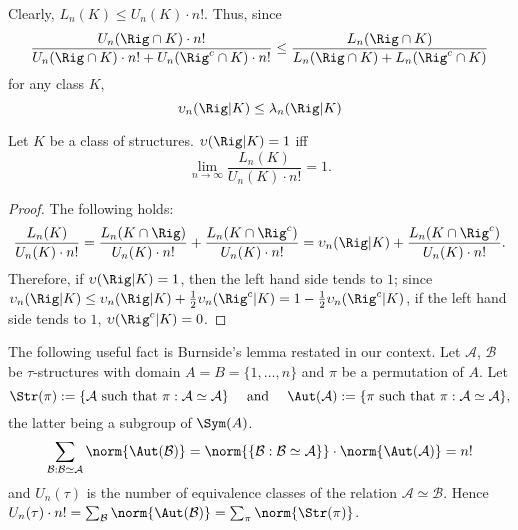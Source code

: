 Clearly, $L_n(K) \le U_n(K) \cdot n!$.
Thus, since
$$\frac{U_n(\Rig \cap K) \cdot n!}{U_n(\Rig \cap K) \cdot n! + U_n(\Rig^c \cap K) \cdot n!} \le \frac{L_n(\Rig \cap K) }{L_n(\Rig \cap K) +L_n(\Rig^c \cap K) } $$ 
for any class $K$, 
\begin{equation}
\label{ineq}
\upsilon_n(\Rig|K) \le \lambda_n (\Rig|K)
\end{equation}
 
\begin{lem} 
\label{equiv}
Let $K$ be a class of structures. 
$\upsilon(\Rig|K)=1$ iff $$\lim_{n \to \infty} \frac{L_n(K)}{U_n(K) \cdot n!}=1\text{.}$$
\begin{proof} The following holds: 
$$\frac{L_n(K)}{U_n(K) \cdot n!} = \frac{L_n(K \cap \Rig)}{U_n(K) \cdot n!}+\frac{L_n(K\cap \Rig^c)}{U_n(K) \cdot n!}=\upsilon_n(\Rig|K)+\frac{L_n(K\cap \Rig^c)}{U_n(K) \cdot n!}\text{.}$$
Therefore, if $\upsilon(\Rig|K)=1$, then the left hand side tends to $1$; since $\upsilon_n(\Rig|K) \le \upsilon_n(\Rig|K) +\frac{1}{2} \upsilon_n(\Rig^c|K) =1-\frac{1}{2} \upsilon_n(\Rig^c|K)$, if the left hand side tends to $1$, $\upsilon(\Rig^c|K)=0$.
\end{proof}
\end{lem} 

\begin{rem}
\label{burnside} 
The following useful fact is Burnside's lemma restated in our context.
Let $\mathcal{A}$, $\mathcal{B}$ be $\tau$-structures with domain $A=B=\{1, \ldots, n\}$ and $\pi$ be a permutation of $A$. 
Let 
$$\Str(\pi):=\{\mathcal{A} \text{ such that } \pi : \mathcal{A} \simeq \mathcal{A}\} \quad \text{ and }  \quad \Aut(\mathcal{A}):=\{ \pi \text{ such that } \pi : \mathcal{A} \simeq \mathcal{A}\}\text{,}$$ the latter being a subgroup of $\Sym(A)$. 
$$\sum_{\mathcal{B} : \mathcal{B} \simeq \mathcal{A}}\norm{\Aut(\mathcal{B})}=\norm{\{\mathcal{B} : \mathcal{B} \simeq \mathcal{A}\}}\cdot \norm{\Aut(\mathcal{A})}=n!$$ and $U_n(\tau)$ is the number of equivalence classes of the relation $\mathcal{A} \simeq \mathcal{B}$. 
Hence $U_n(\tau) \cdot n!=\sum_{\mathcal{B}} \norm{\Aut(\mathcal{B})}=\sum_{\pi} \norm{\Str(\pi)}$.
\end{rem} 

